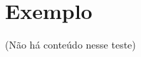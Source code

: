 \documentclass[]{../ufsc-thesis-rn46-2019/ufsc-thesis-rn46-2019}
\begin{document}

\pretextual%
\imprimircapa%
\imprimirfolhaderosto*
\protect{}
\imprimirfolhadecertificacao
\clearpage \listoffigures* 
\clearpage \tableofcontents*%

\textual%

\chapter{Exemplo}

(Não há conteúdo nesse teste)


\postextual
\end{document}
